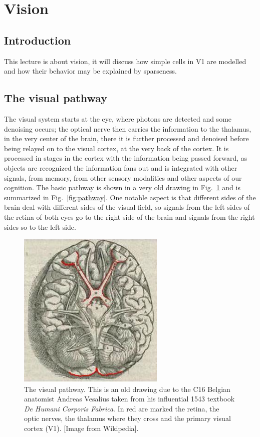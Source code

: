 \documentclass[11pt,a4paper]{scrartcl}
\begin{document}
\section*{Vision}

\subsection*{Introduction} 
This lecture is about vision, it will discuss how simple cells in V1 are
modelled and how their behavior may be explained by sparseness.

\subsection*{The visual pathway}
The visual system starts at the eye, where photons are detected and
some denoising occurs; the optical nerve then carries the information
to the thalamus, in the very center of the brain, there it is further
processed and denoised before being relayed on to the visual cortex,
at the very back of the cortex. It is processed in stages in the
cortex with the information being passed forward, as objects are
recognized the information fans out and is integrated with other
signals, from memory, from other sensory modalities and other aspects
of our cognition. The basic pathway is shown in a very old drawing in
Fig.~\ref{fig:Fabrica} and is summarized in
Fig.~\ref{fig:pathway}. One notable aspect is that different sides of
the brain deal with different sides of the visual field, so signals
from the left sides of the retina of both eyes go to the right side of
the brain and signals from the right sides so to the left side.

\begin{figure}
\begin{center}
\includegraphics[width=7cm]{Fabrica_VisualSystem.jpg}
\end{center}
\caption{The visual pathway. This is an old drawing due to the C16
  Belgian anatomist Andreas Vesalius taken from his influential 1543
  textbook \textsl{De Humani Corporis Fabrica}. In red are marked the
  retina, the optic nerves, the thalamus where they cross and the
  primary visual cortex (V1). [Image from Wikipedia].\label{fig:Fabrica}}
\end{figure}
\end{document}
